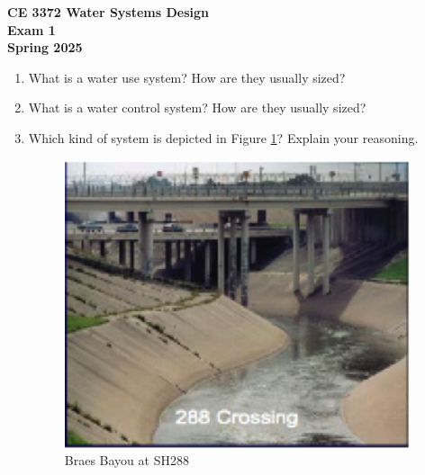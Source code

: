 \documentclass[12pt]{article}
\begin{document}
\begingroup
\begin{center}
{\textbf{{ CE 3372 Water Systems Design} \\ Exam 1 \\ Spring 2025} }
\end{center}
\endgroup


\begin{enumerate}
\item What is a water use system? How are they usually sized?\\
\item What is a water control system? How are they usually sized?\\
\item Which kind of system is depicted in Figure \ref{fig:whiteoakbayou}?  Explain your reasoning.
\begin{figure}[h!] %
   \centering
   \includegraphics[width=4in]{whiteoakbayou.jpg} 
   \caption{Braes Bayou at SH288}
   \label{fig:whiteoakbayou}
\end{figure}


\end{enumerate}
\end{document}
